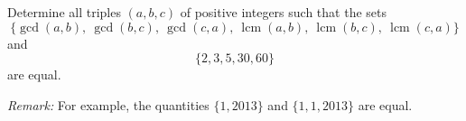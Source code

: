 Determine all triples $(a,b,c)$ of positive integers such that the sets
\[
    \Big\{\gcd(a,b),\ \gcd(b,c),\ \gcd(c,a),\ \operatorname{lcm}(a,b),\ \operatorname{lcm}(b,c),\ \operatorname{lcm}(c,a)\Big\}
\]
and 
\[
    \{2, 3, 5, 30, 60\}
\]
are equal.

\emph{Remark:} For example, the quantities $\{1,2013\}$ and $\{1,1,2013\}$ are equal.
